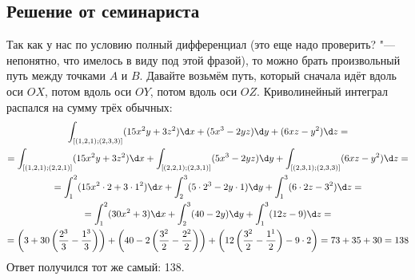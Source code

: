 	\subsection{Решение от семинариста}
		Так как у нас по условию полный дифференциал
		(\TODO это еще надо проверить? "--- непонятно, что имелось в виду под этой фразой),
		то можно брать произвольный путь между точками $A$ и $B$.
		Давайте возьмём путь, который сначала идёт вдоль оси $OX$, потом вдоль оси $OY$,
		потом вдоль оси $OZ$.
		Криволинейный интеграл распался на сумму трёх обычных:
		\begin{gather*}
			\int_{[(1,2,1);(2,3,3)]} (15x^2y+3z^2)\d x + (5x^3-2yz)\d y + (6xz-y^2) \d z = \\
			= \int_{[(1,2,1);(2,2,1)]} (15x^2y+3z^2)\d x +
			\int_{[(2,2,1);(2,3,1)]} (5x^3-2yz)\d y  +
			\int_{[(2,3,1);(2,3,3)]} (6xz-y^2) \d z = \\
			= \int_1^2 (15x^2\cdot2+3\cdot1^2)\d x +
			\int_2^3 (5\cdot2^3-2y\cdot1)\d y  +
			\int_1^3 (6\cdot2z-3^2) \d z = \\
			= \int_1^2 (30x^2+3)\d x +
			\int_2^3 (40-2y)\d y  +
			\int_1^3 (12z-9) \d z = \\
			= \left(3 + 30\left(\frac{2^3}{3}-\frac{1^3}{3}\right)\right) +
			\left(40 - 2\left(\frac{3^2}{2}-\frac{2^2}{2}\right)\right) +
			\left(12\left(\frac{3^2}{2}-\frac{1^1}{2}\right)-9\cdot2\right) =
			73 + 35 + 30 = 138
		\end{gather*}
		Ответ получился тот же самый: 138.

